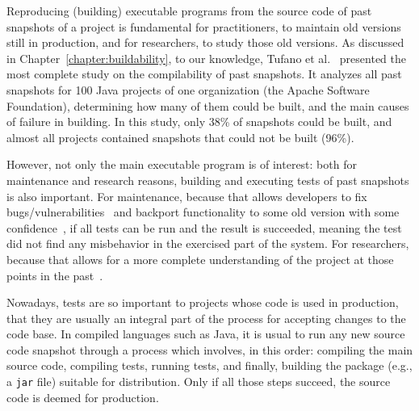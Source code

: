 
Reproducing (building) executable programs from the source code of past snapshots of a project is fundamental for practitioners, to maintain old versions still in production, and for researchers, to study those old versions. 
As discussed in Chapter~\ref{chapter:buildability}, to our knowledge, Tufano et al.~\cite{tufano2017there} presented the most complete study on the compilability of past snapshots.
It analyzes all past snapshots for 100 Java projects of one organization (the Apache Software Foundation), determining how many of them could be built, and the main causes of failure in building. 
In this study, only 38\% of snapshots could be built, and almost all projects contained snapshots that could not be built (96\%).

However, not only the main executable program is of interest: both for maintenance and research reasons, building and executing tests of past snapshots is also important. 
For maintenance, because that allows developers to fix bugs/vulnerabilities~\cite{bartelsoftware} and backport functionality to some old version with some confidence~\cite{tian2017mining}, if all tests can be run and the result is succeeded, meaning the test did not find any misbehavior in the exercised part of the system. 
For researchers, because that allows for a more complete understanding of the project at those points in the past~\cite{santos2019mind}.



Nowadays, tests are so important to projects whose code is used in production, that they are usually an integral part of the process for accepting changes to the code base. 
In compiled languages such as Java, it is usual to run any new source code snapshot through a process which involves, in this order: compiling the main source code, compiling tests, running tests, and finally, building the package (e.g., a \texttt{jar} file) suitable for distribution. 
Only if all those steps succeed, the source code is deemed for production.

